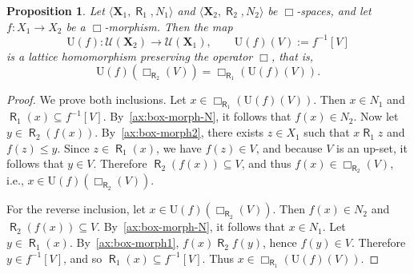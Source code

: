 \documentclass[10pt,a4paper]{amsart}
\newtheorem{proposition}[theorem]{Proposition}
\DeclareMathOperator{\R}{\mathsf{R}}
\newcommand{\X}{\mathbf{X}}
\newcommand{\U}{\mathcal{U}}
\begin{document}
\begin{proposition}
\label{prop:Uf-box-morphism}
Let $\langle \X_1, \R_1, N_1 \rangle$ and $\langle \X_2, \R_2, N_2 \rangle$ be $\Box$-spaces, and let $f \colon X_1 \to X_2$ be a $\Box$-morphism. Then the map
\[
\mathrm{U}(f) \colon \U(\X_2) \to \U(\X_1), \qquad \mathrm{U}(f)(V) := f^{-1}[V]
\]
is a lattice homomorphism preserving the operator $\Box$, that is,
\[
\mathrm{U}(f)(\Box_{\R_2}(V)) = \Box_{\R_1}(\mathrm{U}(f)(V)).
\]
\end{proposition}
\begin{proof}
We prove both inclusions. Let $x \in \Box_{\R_1}(\mathrm{U}(f)(V))$. Then $x \in N_1$ and $\R_1(x) \subseteq f^{-1}[V]$. By~\eqref{ax:box-morph-N}, it follows that $f(x) \in N_2$. Now let $y \in \R_2(f(x))$. By~\eqref{ax:box-morph2}, there exists $z \in X_1$ such that $x\R_1 z$ and $f(z) \leq y$. Since $z \in \R_1(x)$, we have $f(z) \in V$, and because $V$ is an up-set, it follows that $y \in V$. Therefore $\R_2(f(x)) \subseteq V$, and thus $f(x) \in \Box_{\R_2}(V)$, i.e., $x \in \mathrm{U}(f)(\Box_{\R_2}(V))$.

For the reverse inclusion, let $x \in \mathrm{U}(f)(\Box_{\R_2}(V))$. Then $f(x) \in N_2$ and $\R_2(f(x)) \subseteq V$. By~\eqref{ax:box-morph-N}, it follows that $x \in N_1$. Let $y \in \R_1(x)$. By~\eqref{ax:box-morph1}, $f(x) \R_2 f(y)$, hence $f(y) \in V$. Therefore $y \in f^{-1}[V]$, and so $\R_1(x) \subseteq f^{-1}[V]$. Thus $x \in \Box_{\R_1}(\mathrm{U}(f)(V))$.
\end{proof}
\end{document}
